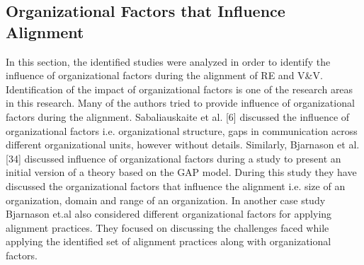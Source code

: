 \documentclass{article}
\begin{document}
\subsection{Organizational Factors that Influence Alignment}\label{ResultsOrgFactors}
In this section, the identified studies were analyzed in order to identify the influence of organizational factors during the alignment of RE and V&V. Identification of the impact of organizational factors is one of the research areas in this research.
Many of the authors tried to provide influence of organizational factors during the alignment.  Sabaliauskaite et al. [6] discussed the influence of organizational factors i.e. organizational structure, gaps in communication across different organizational units, however without details.  Similarly, Bjarnason et al.[34] discussed influence of organizational factors during a study to present an initial version of a theory based on the GAP model. During this study they have discussed the organizational factors that influence the alignment i.e. size of an organization, domain and range of an organization. In another case study \cite{bjarnason2014challenges} Bjarnason et.al also considered different organizational factors for applying alignment practices. They focused on discussing the challenges faced while applying the identified set of alignment practices along with organizational factors. 
\end{document}
